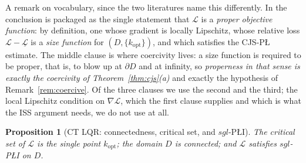 \documentclass[11pt]{article}
\theoremstyle{plain}
\newtheorem{prop}[thm]{Proposition}
\theoremstyle{definition}
\theoremstyle{remark}
\begin{document}
A remark on vocabulary, since the two literatures name this differently. In
\cite{CuiJiangSontag2024} the conclusion is packaged as the single statement that
$\mathcal{L}$ is a \emph{proper objective function}: by definition, one whose
gradient is locally Lipschitz, whose relative loss
$\mathcal{L}-\underline{\mathcal{L}}$ is a \emph{size function} for
$(D,\{k_{\mathrm{opt}}\})$, and which satisfies the CJS-P\L{} estimate. The middle
clause is where coercivity lives: a size function is required to be proper, that
is, to blow up at $\partial D$ and at infinity, so \emph{properness in that sense
is exactly the coercivity of Theorem~\ref{thm:cjs}(a)} and exactly the hypothesis
of Remark~\ref{rem:coercive}. Of the three clauses we use the second and the third;
the local Lipschitz condition on $\nabla\mathcal{L}$, which the first
clause supplies and which is what the ISS argument needs, we do not use at all.

\begin{prop}[CT LQR: connectedness, critical set, and $sgl$-P\L{}I]\label{prop:lqrsgl}
The critical set of $\mathcal{L}$ is the single point $k_{\mathrm{opt}}$; the
domain $D$ is connected; and $\mathcal{L}$ satisfies $sgl$-P\L{}I on $D$.
\end{prop}
\end{document}
